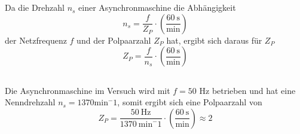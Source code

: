 \chapter{}\label{ex:aufg4}
%
\section{}\label{sec:aufg4a}
Da die Drehzahl $n_s$ einer Asynchronmaschine die Abhängigkeit
\begin{equation}
	n_s = \frac{f}{Z_P}\cdot \left(\frac{60~\text{s}}{\text{min}}\right)
\end{equation}
der Netzfrequenz $f$ und der Polpaarzahl $Z_P$  hat, ergibt sich daraus für $Z_P$
\begin{equation}
	Z_P = \frac{f}{n_s}\cdot \left(\frac{60~\text{s}}{\text{min}}\right)
\end{equation}
%

\section{}\label{sec:aufg4b}
Die Asynchronmaschine im Versuch wird mit $f = 50$ Hz betrieben und hat eine Nenndrehzahl $n_s = 1370 \mathrm{min}^-1$, somit ergibt sich eine Polpaarzahl von
\begin{equation}
	Z_P = \frac{50~\text{Hz}}{1370~\text{min}^-1} \cdot \left(\frac{60~\text{s}}{\text{min}}\right) \approx 2
\end{equation}